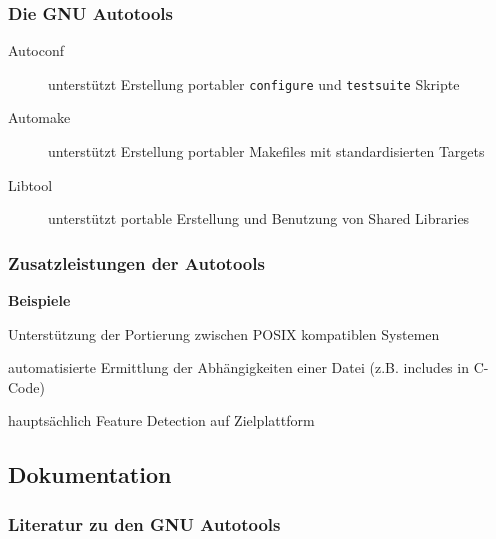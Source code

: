 \begin{frame}
	\frametitle{Die GNU Autotools}
	\begin{description}
		\item[Autoconf]	unterstützt Erstellung portabler \texttt{configure} und \texttt{testsuite} Skripte
		\item[Automake]	unterstützt Erstellung portabler Makefiles mit standardisierten Targets
		\item[Libtool] 	unterstützt portable Erstellung und Benutzung von Shared Libraries
	\end{description}
\end{frame}
%

\begin{frame}
	\frametitle{Zusatzleistungen der Autotools}
	\textbf{Beispiele}
	\begin{description}[Abhängigkeitsverfolgung]
		\item[Portabilität] Unterstützung der Portierung zwischen POSIX kompatiblen Systemen
		\item[Abhängigkeitsverfolgung] automatisierte Ermittlung der Abhängigkeiten einer Datei (z.B. includes in C-Code)
		\item[mehr implizite Regeln] 
		\item[Ausführung von Tests] hauptsächlich Feature Detection auf Zielplattform
	\end{description}
\end{frame}

\subsection{Dokumentation}
\begin{frame}
	\frametitle{Literatur zu den GNU Autotools}
\end{frame}
